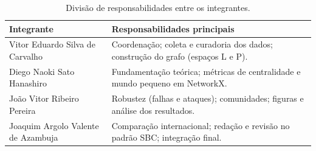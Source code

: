 \documentclass[12pt]{article}
\begin{document}
\begin{table}[ht]
  \centering
  \caption{Divisão de responsabilidades entre os integrantes.}
  \label{tab:resp}
  \small
  \begin{tabular}{@{}p{4.4cm}p{8.4cm}@{}}
    \toprule
    \textbf{Integrante} & \textbf{Responsabilidades principais} \\
    \midrule
    Vitor Eduardo Silva de Carvalho & Coordenação; coleta e curadoria dos dados;
      construção do grafo (espaços L e P). \\
    Diego Naoki Sato Hanashiro & Fundamentação teórica; métricas de centralidade e
      mundo pequeno em NetworkX. \\
    João Vitor Ribeiro Pereira & Robustez (falhas e ataques); comunidades; figuras
      e análise dos resultados. \\
    Joaquim Argolo Valente de Azambuja & Comparação internacional; redação e
      revisão no padrão SBC; integração final. \\
    \bottomrule
  \end{tabular}
\end{table}



\end{document}
